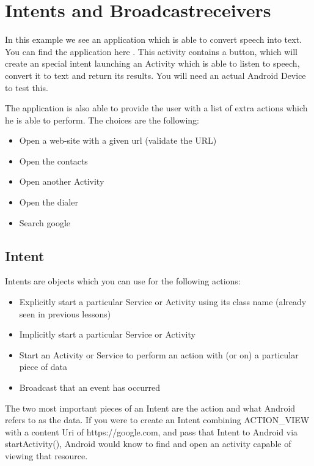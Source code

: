 
\chapter{Intents and Broadcastreceivers}


\begin{example}
	In this example we see an application which is able to convert speech into text.
	You can find the application here \cite{Buysse18}.
	This activity contains a button, which will create an special intent launching an Activity which is able to listen to speech, convert it to text and return its results.
	You will need an actual Android Device to test this. 
	
	The application is also  able to provide the user with a list of extra actions which he is able to perform. The choices are the following:
	\begin{itemize}
		\item Open a web-site with a given url (validate the URL)
		\item Open the contacts
		\item Open another Activity
		\item Open the dialer
		\item Search google
	\end{itemize}
	
\end{example}


\section{Intent}
Intents are objects which you can use for the following actions:


\begin{itemize}
	\item Explicitly start a particular Service or Activity using its class name (already seen in previous lessons)
	\item Implicitly start a particular Service or Activity
	\item Start an Activity or Service to perform an action with (or on) a particular piece of data
	\item Broadcast that an event has occurred
\end{itemize}

The two most important pieces of an Intent are the action and what Android refers to as the data.
If you were to create an Intent combining ACTION\_VIEW with a content Uri of https://google.com, and pass that Intent to Android via startActivity(), Android would know to find and open an activity capable of viewing that resource.


